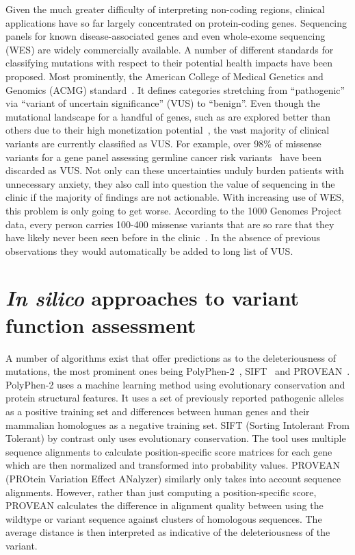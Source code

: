 Given the much greater difficulty of interpreting non-coding regions, clinical applications have so far largely concentrated on protein-coding genes. Sequencing panels for known disease-associated genes and even whole-exome sequencing (WES) are widely commercially available. A number of different standards for classifying mutations with respect to their potential health impacts have been proposed. Most prominently, the American College of Medical Genetics and Genomics (ACMG) standard~. It defines categories stretching from ``pathogenic'' via ``variant of uncertain significance'' (VUS) to ``benign''. Even though the mutational landscape for a handful of genes, such as  are explored better than others due to their high monetization potential~\cite{cheon_variants_2014}, the vast majority of clinical variants are currently classified as VUS. For example, over 98\% of missense variants for a gene panel assessing germline cancer risk variants~\cite{maxwell_evaluation_2016} have been discarded as VUS. Not only can these uncertainties unduly burden patients with unnecessary anxiety, they also call into question the value of sequencing in the clinic if the majority of findings are not actionable. With increasing use of WES, this problem is only going to get worse. According to  the 1000 Genomes Project data, every person carries 100-400 missense variants that are so rare that they have likely never been seen before in the clinic~\cite{the_1000_genomes_project_consortium_global_2015}. In the absence of previous observations they would automatically be added to long list of VUS.

\section{\textit{In silico} approaches to variant function assessment}
\label{insilicoIntro}

A number of algorithms exist that offer predictions as to the deleteriousness of mutations, the most prominent ones being PolyPhen-2~\cite{adzhubei_predicting_2001}, SIFT~\cite{ng_predicting_2001} and PROVEAN~\cite{choi_predicting_2012}. PolyPhen-2 uses a machine learning method using evolutionary conservation and protein structural features. It uses a set of previously reported pathogenic alleles as a positive training set and differences between human genes and their mammalian homologues as a negative training set. SIFT (Sorting Intolerant From Tolerant) by contrast only uses evolutionary conservation. The tool uses multiple sequence alignments to calculate position-specific score matrices for each gene which are then normalized and transformed into probability values. PROVEAN (PROtein Variation Effect ANalyzer) similarly only takes into account sequence alignments. However, rather than just computing a position-specific score, PROVEAN calculates the difference in alignment quality between using the wildtype or variant sequence against clusters of homologous sequences. The average distance is then interpreted as indicative of the deleteriousness of the variant. 

